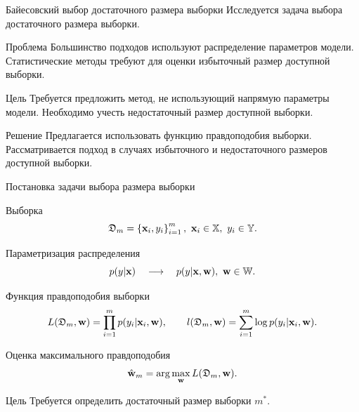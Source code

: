 \documentclass{beamer}
\begin{document}
\begin{frame}[noframenumbering,plain]
	\titlepage
\end{frame}
\begin{frame}{Байесовский выбор достаточного размера выборки}
    Исследуется задача выбора достаточного размера выборки.
    \vfill
    \begin{block}{Проблема}
        Большинство подходов используют распределение параметров модели. Статистические методы требуют для оценки избыточный размер доступной выборки.
    \end{block}
    \vfill
    \begin{block}{Цель}
        Требуется предложить метод, не использующий напрямую параметры модели. Необходимо учесть недостаточный размер доступной выборки.
    \end{block}
    \vfill
    \begin{block}{Решение}
        Предлагается использовать функцию правдоподобия выборки. Рассматривается подход в случаях избыточного и недостаточного размеров доступной выборки. 
    \end{block}
\end{frame}
\begin{frame}{Постановка задачи выбора размера выборки}
    \begin{block}{Выборка}
        \vspace{-0.3cm}
        \[ \mathfrak{D}_m = \left\{ \mathbf{x}_i, y_i \right\}_{i = 1}^{m}, \ \mathbf{x}_i \in \mathbb{X}, \ y_i \in \mathbb{Y}. \]
        \vspace{-0.7cm}
    \end{block}
    \begin{block}{Параметризация распределения}
        \vspace{-0.3cm}
        \[ p(y | \mathbf{x}) \quad \longrightarrow \quad p(y | \mathbf{x}, \mathbf{w}), \ \mathbf{w} \in \mathbb{W}. \]
        \vspace{-0.7cm}
    \end{block}
    \begin{block}{Функция правдоподобия выборки}
        \vspace{-0.5cm}
        \[ L(\mathfrak{D}_m, \mathbf{w}) = \prod_{i=1}^{m} p(y_i | \mathbf{x}_i, \mathbf{w}), \qquad l(\mathfrak{D}_m, \mathbf{w}) = \sum\limits_{i=1}^{m} \log p(y_i | \mathbf{x}_i, \mathbf{w}). \]
        \vspace{-0.5cm}
    \end{block}
    \begin{block}{Оценка максимального правдоподобия}
        \vspace{-0.3cm}
        \[ \hat{\mathbf{w}}_{m} = \arg\max_{\mathbf{w}} L(\mathfrak{D}_m, \mathbf{w}). \]
        \vspace{-0.7cm}
    \end{block}
    \begin{block}{Цель}
        Требуется определить достаточный размер выборки $m^*$.
    \end{block}
\end{frame}
\end{document}
